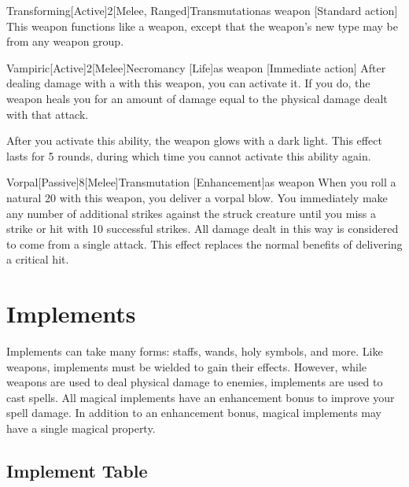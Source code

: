         \begin{magicitemdef}{Transforming}[Active]{2}[Melee, Ranged]{Transmutation}{as weapon}
            [Standard action] This weapon functions like a  weapon, except that the weapon's new type may be from any weapon group.
        \end{magicitemdef}

        \begin{magicitemdef}{Vampiric}[Active]{2}[Melee]{Necromancy [Life]}{as weapon}
            [Immediate action] After dealing damage with a  with this weapon, you can activate it.
            If you do, the weapon heals you for an amount of damage equal to the physical damage dealt with that attack.

            After you activate this ability, the weapon glows with a dark light.
            This effect lasts for 5 rounds, during which time you cannot activate this ability again.
        \end{magicitemdef}

        \begin{magicitemdef}{Vorpal}[Passive]{8}[Melee]{Transmutation [Enhancement]}{as weapon}
             When you roll a natural 20 with this weapon, you deliver a vorpal blow.
            You immediately make any number of additional strikes against the struck creature until you miss a strike or hit with 10 successful strikes.
            All damage dealt in this way is considered to come from a single attack.
            This effect replaces the normal benefits of delivering a critical hit.
        \end{magicitemdef}

\section{Implements}
    Implements can take many forms: staffs, wands, holy symbols, and more.
    Like weapons, implements must be wielded to gain their effects.
    However, while weapons are used to deal physical damage to enemies, implements are used to cast spells.
    All magical implements have an enhancement bonus to improve your spell damage.
    In addition to an enhancement bonus, magical implements may have a single magical property.

    \onecolumn
    \subsection{Implement Table}

